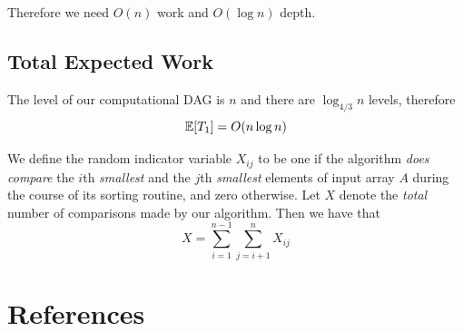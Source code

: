 \documentclass[11pt]{article}
\begin{document}
Therefore we need \(O(n)\) work and \(O(\log n)\) depth.
\subsection{Total Expected Work}
\label{sec:orgdf669d8}
The level of our computational DAG is \(n\) and there are \(\log_{4/3}n\) levels, therefore
\begin{equation*}
\mathbb{E}[T_1]=O(n\log n)
\end{equation*}

We define the random indicator variable \(X_{ij}\) to be one if the algorithm \emph{does compare}
the \(i\)th \emph{smallest} and the \(j\)th \emph{smallest} elements of input array \(A\) during the course of
its sorting routine, and zero otherwise. Let \(X\) denote the \emph{total} number of comparisons made
by our algorithm. Then we have that
\begin{equation*}
X=\sum_{i=1}^{n-1}\sum_{j=i+1}^nX_{ij}
\end{equation*}
\section{References}
\label{sec:orgb962420}
\label{bibliographystyle link}


\label{bibliography link}

\end{document}
